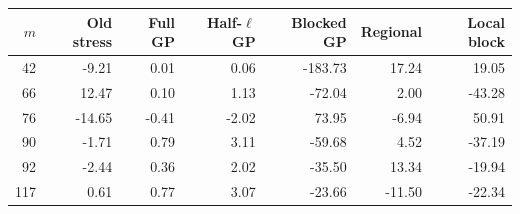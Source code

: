 \begin{center}\small\begin{tabular}{rrrrrrr}\toprule
$m$ & Old stress & Full GP & Half-$\ell$ GP & Blocked GP & Regional & Local block\\\midrule
42 & -9.21 & 0.01 & 0.06 & -183.73 & 17.24 & 19.05\\
66 & 12.47 & 0.10 & 1.13 & -72.04 & 2.00 & -43.28\\
76 & -14.65 & -0.41 & -2.02 & 73.95 & -6.94 & 50.91\\
90 & -1.71 & 0.79 & 3.11 & -59.68 & 4.52 & -37.19\\
92 & -2.44 & 0.36 & 2.02 & -35.50 & 13.34 & -19.94\\
117 & 0.61 & 0.77 & 3.07 & -23.66 & -11.50 & -22.34\\
\bottomrule\end{tabular}\end{center}

